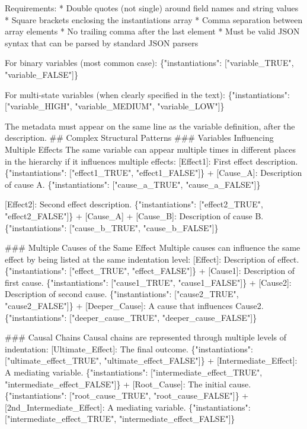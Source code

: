 \documentclass[
  11pt,
  letterpaper,
]{book}
\newenvironment{Shaded}{\begin{snugshade}}{\end{snugshade}}
\newcommand{\StringTok}[1]{\textcolor[rgb]{0.13,0.47,0.30}{#1}}
\begin{document}
\begin{landscape}
\begin{Shaded}
\begin{Highlighting}[]
\StringTok{Requirements:}
\StringTok{* Double quotes (not single) around field names and string values}
\StringTok{* Square brackets enclosing the instantiations array}
\StringTok{* Comma separation between array elements}
\StringTok{* No trailing comma after the last element}
\StringTok{* Must be valid JSON syntax that can be parsed by standard JSON parsers}

\StringTok{For binary variables (most common case):}
\StringTok{\{"instantiations": ["variable\_TRUE", "variable\_FALSE"]\}}

\StringTok{For multi{-}state variables (when clearly specified in the text):}
\StringTok{\{"instantiations": ["variable\_HIGH", "variable\_MEDIUM", "variable\_LOW"]\}}

\StringTok{The metadata must appear on the same line as the variable definition, after the description.}
\StringTok{\#\# Complex Structural Patterns}
\StringTok{\#\#\# Variables Influencing Multiple Effects}
\StringTok{The same variable can appear multiple times in different places in the hierarchy if it influences multiple effects:}
\StringTok{[Effect1]: First effect description. \{"instantiations": ["effect1\_TRUE", "effect1\_FALSE"]\}}
\StringTok{  + [Cause\_A]: Description of cause A. \{"instantiations": ["cause\_a\_TRUE", "cause\_a\_FALSE"]\}}

\StringTok{[Effect2]: Second effect description. \{"instantiations": ["effect2\_TRUE", "effect2\_FALSE"]\}}
\StringTok{  + [Cause\_A]}
\StringTok{  + [Cause\_B]: Description of cause B. \{"instantiations": ["cause\_b\_TRUE", "cause\_b\_FALSE"]\}}

\StringTok{\#\#\# Multiple Causes of the Same Effect}
\StringTok{Multiple causes can influence the same effect by being listed at the same indentation level:}
\StringTok{[Effect]: Description of effect. \{"instantiations": ["effect\_TRUE", "effect\_FALSE"]\}}
\StringTok{  + [Cause1]: Description of first cause. \{"instantiations": ["cause1\_TRUE", "cause1\_FALSE"]\}}
\StringTok{  + [Cause2]: Description of second cause. \{"instantiations": ["cause2\_TRUE", "cause2\_FALSE"]\}}
\StringTok{    + [Deeper\_Cause]: A cause that influences Cause2. \{"instantiations": ["deeper\_cause\_TRUE", "deeper\_cause\_FALSE"]\}}

\StringTok{\#\#\# Causal Chains}
\StringTok{Causal chains are represented through multiple levels of indentation:}
\StringTok{[Ultimate\_Effect]: The final outcome. \{"instantiations": ["ultimate\_effect\_TRUE", "ultimate\_effect\_FALSE"]\}}
\StringTok{  + [Intermediate\_Effect]: A mediating variable. \{"instantiations": ["intermediate\_effect\_TRUE", "intermediate\_effect\_FALSE"]\}}
\StringTok{    + [Root\_Cause]: The initial cause. \{"instantiations": ["root\_cause\_TRUE", "root\_cause\_FALSE"]\}}
\StringTok{  + [2nd\_Intermediate\_Effect]: A mediating variable. \{"instantiations": ["intermediate\_effect\_TRUE", "intermediate\_effect\_FALSE"]\}}



\end{Highlighting}
\end{Shaded}
\end{landscape}
\end{document}

